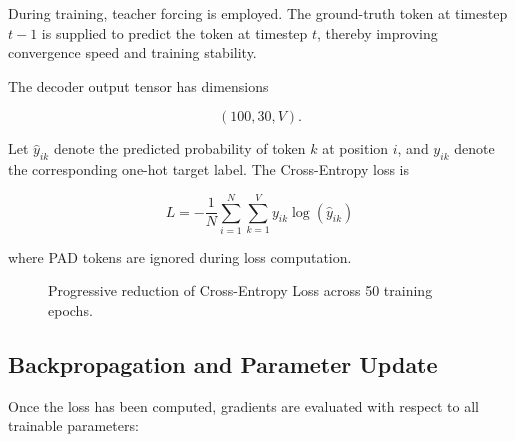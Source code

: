 \documentclass[twocolumn]{article}
\begin{document}
During training, teacher forcing is employed. The ground-truth token at timestep \(t-1\) is supplied to predict the token at timestep \(t\), thereby improving convergence speed and training stability.

The decoder output tensor has dimensions

\[
(100,30,V).
\]

Let \(\hat{y}_{ik}\) denote the predicted probability of token \(k\) at position \(i\), and \(y_{ik}\) denote the corresponding one-hot target label. The Cross-Entropy loss is

\begin{equation}
L
=
-\frac{1}{N}
\sum_{i=1}^{N}
\sum_{k=1}^{V}
y_{ik}
\log(\hat{y}_{ik})
\end{equation}

where PAD tokens are ignored during loss computation.

\begin{figure}[!t]
\centering


\caption{Progressive reduction of Cross-Entropy Loss across 50 training epochs.}
\label{fig:jscc_loss}
\end{figure}

\subsection{Backpropagation and Parameter Update}

Once the loss has been computed, gradients are evaluated with respect to all trainable parameters:
\end{document}
